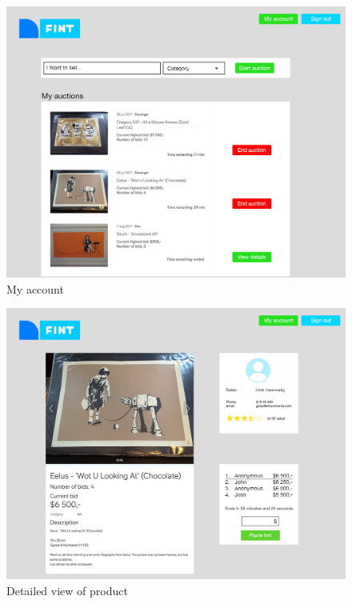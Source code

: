 \begin{figure}
	\caption{My account}
	\centering
		\includegraphics[scale=0.38]{figures/my-account}
\end{figure}

\begin{figure}
	\caption{Detailed view of product}
	\centering
		\includegraphics[scale=0.38]{figures/detailed-view-of-product}
\end{figure}

